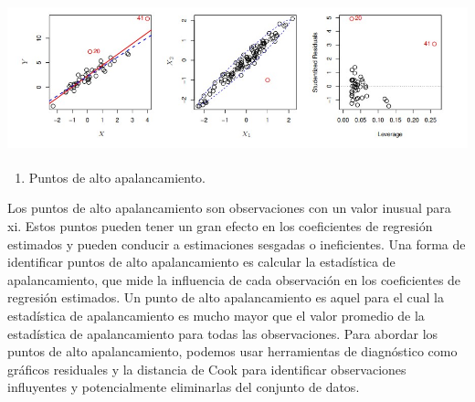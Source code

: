\documentclass[
  letterpaper,
  DIV=11,
  numbers=noendperiod]{scrartcl}
\let\oldparagraph\paragraph
\renewcommand{\paragraph}[1]{\oldparagraph{#1}\mbox{}}
\providecommand{\tightlist}{%
  \setlength{\itemsep}{0pt}\setlength{\parskip}{0pt}}\usepackage{longtable,booktabs,array}
\begin{document}
\hypertarget{figura-13.-izquierda-la-observaciuxf3n-41-es-un-punto-de-alto-apalancamiento-mientras-que-la-20-no-lo-es.-la-luxednea-roja-es-el-ajuste-a-todos-los-datos-y-la-luxednea-azul-es-el-ajuste-con-la-observaciuxf3n.-41-eliminados.-centro-la-observaciuxf3n-roja-no-es-inusual-en-tuxe9rminos-de-su-valor-x1-o-su-valor-x2-pero-auxfan-queda-fuera-de-la-mayor-parte-de-los-datos-y-por-lo-tanto-tiene-un-alto-aprovechar.-derecha-la-observaciuxf3n-41-tiene-un-alto-apalancamiento-y-un-alto-residual.}{%
\paragraph{\texorpdfstring{\protect\includegraphics{images/outl.jpg}}{FIGURA 13. Izquierda: la observación 41 es un punto de alto apalancamiento, mientras que la 20 no lo es. La línea roja es el ajuste a todos los datos, y la línea azul es el ajuste con la observación. 41 eliminados. Centro: la observación roja no es inusual en términos de su valor X1 o su valor X2, pero aún queda fuera de la mayor parte de los datos y, por lo tanto, tiene un alto aprovechar. Derecha: la observación 41 tiene un alto apalancamiento y un alto residual.}}\label{figura-13.-izquierda-la-observaciuxf3n-41-es-un-punto-de-alto-apalancamiento-mientras-que-la-20-no-lo-es.-la-luxednea-roja-es-el-ajuste-a-todos-los-datos-y-la-luxednea-azul-es-el-ajuste-con-la-observaciuxf3n.-41-eliminados.-centro-la-observaciuxf3n-roja-no-es-inusual-en-tuxe9rminos-de-su-valor-x1-o-su-valor-x2-pero-auxfan-queda-fuera-de-la-mayor-parte-de-los-datos-y-por-lo-tanto-tiene-un-alto-aprovechar.-derecha-la-observaciuxf3n-41-tiene-un-alto-apalancamiento-y-un-alto-residual.}}

\begin{enumerate}
\def\labelenumi{\arabic{enumi}.}
\setcounter{enumi}{4}
\tightlist
\item
  Puntos de alto apalancamiento.
\end{enumerate}

Los puntos de alto apalancamiento son observaciones con un valor inusual
para xi. Estos puntos pueden tener un gran efecto en los coeficientes de
regresión estimados y pueden conducir a estimaciones sesgadas o
ineficientes. Una forma de identificar puntos de alto apalancamiento es
calcular la estadística de apalancamiento, que mide la influencia de
cada observación en los coeficientes de regresión estimados. Un punto de
alto apalancamiento es aquel para el cual la estadística de
apalancamiento es mucho mayor que el valor promedio de la estadística de
apalancamiento para todas las observaciones. Para abordar los puntos de
alto apalancamiento, podemos usar herramientas de diagnóstico como
gráficos residuales y la distancia de Cook para identificar
observaciones influyentes y potencialmente eliminarlas del conjunto de
datos.
\end{document}
